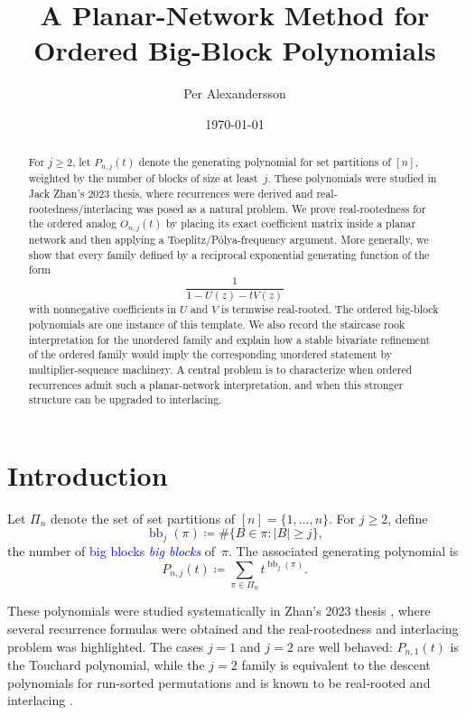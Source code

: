 \documentclass[11pt,reqno]{amsart}
\title{A Planar-Network Method for Ordered Big-Block Polynomials}
\author{Per Alexandersson}
\date{\today}
\theoremstyle{definition}
\newcommand{\defin}[1]{%
\relax\ifmmode%
\textcolor{blue}{#1}%
\else \textcolor{blue}{\emph{#1}}%
\fi%
}
\begin{document}
\begin{abstract}
For $j \geq 2$, let $P_{n,j}(t)$ denote the generating polynomial for set
partitions of $[n]$, weighted by the number of blocks of size at least~$j$.
These polynomials were studied in Jack Zhan's 2023 thesis, where recurrences
were derived and real-rootedness/interlacing was posed as a natural problem.
We prove real-rootedness for the ordered analog $O_{n,j}(t)$ by placing its
exact coefficient matrix inside a planar network and then applying a
Toeplitz/P\'olya-frequency argument. More generally, we show that every family
defined by a reciprocal exponential generating function of the form
\[
  \frac{1}{1-U(z)-tV(z)}
\]
with nonnegative coefficients in $U$ and $V$ is termwise real-rooted. The
ordered big-block polynomials are one instance of this template. We also
record the staircase rook interpretation for the unordered family and explain
how a stable bivariate refinement of the ordered family would imply the
corresponding unordered statement by multiplier-sequence machinery. A central
problem is to characterize when ordered recurrences admit such a planar-network
interpretation, and when this stronger structure can be upgraded to
interlacing.
\end{abstract}

\maketitle

\section{Introduction}

Let $\Pi_n$ denote the set of set partitions of $[n]=\{1,\dotsc,n\}$. For
$j \geq 2$, define
\[
  \operatorname{bb}_j(\pi)
  \coloneqq
  \#\{B \in \pi : |B| \geq j\},
\]
the number of \defin{big blocks} of~$\pi$. The associated generating
polynomial is
\[
  P_{n,j}(t)
  \coloneqq
  \sum_{\pi \in \Pi_n} t^{\operatorname{bb}_j(\pi)}.
\]

These polynomials were studied systematically in Zhan's 2023 thesis
\cite{Zhan2023}, where several recurrence formulas were obtained and the
real-rootedness and interlacing problem was highlighted. The cases $j=1$ and
$j=2$ are well behaved: $P_{n,1}(t)$ is the Touchard polynomial, while the
$j=2$ family is equivalent to the descent polynomials for run-sorted
permutations and is known to be real-rooted and interlacing
\cite{AlexanderssonNabawanda2021,BonaHezo2016,Zhan2023}.
\end{document}
